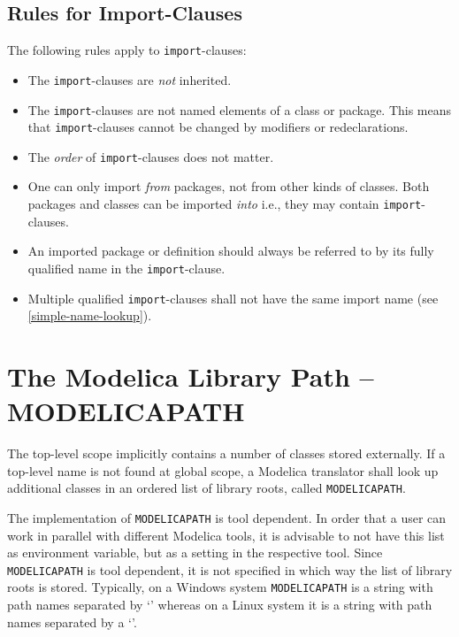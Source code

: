 \subsection{Rules for Import-Clauses}\label{summary-of-rules-for-import-clauses}\label{rules-for-import-clauses}

The following rules apply to \lstinline!import!-clauses:
\begin{itemize}
\item
  The \lstinline!import!-clauses are \emph{not} inherited.
\item
  The \lstinline!import!-clauses are not named elements of a class or package.
  This means that \lstinline!import!-clauses cannot be changed by modifiers or redeclarations.
\item
  The \emph{order} of \lstinline!import!-clauses does not matter.
\item
  One can only import \emph{from} packages, not from other kinds of classes.
  Both packages and classes can be imported \emph{into} i.e., they may contain \lstinline!import!-clauses.
\item
  An imported package or definition should always be referred to by its fully qualified name in the \lstinline!import!-clause.
\item
  Multiple qualified \lstinline!import!-clauses shall not have the same import name (see \cref{simple-name-lookup}).
\end{itemize}

\section{The Modelica Library Path -- MODELICAPATH}\label{the-modelica-library-path-modelicapath}

The top-level scope implicitly contains a number of classes stored externally.
If a top-level name is not found at global scope, a Modelica translator shall look up additional classes in an ordered list of library roots, called \lstinline!MODELICAPATH!.

\begin{nonnormative}
The implementation of \lstinline!MODELICAPATH! is tool dependent.  In order that a user can work in parallel with different Modelica tools, it is advisable to not
have this list as environment variable, but as a setting in the respective tool.  Since \lstinline!MODELICAPATH! is tool dependent, it is not specified in which way
the list of library roots is stored.  Typically, on a Windows system \lstinline!MODELICAPATH! is a string with path names separated by `\filename{;}' whereas on a Linux system
it is a string with path names separated by a `\filename{:}'.
\end{nonnormative}

